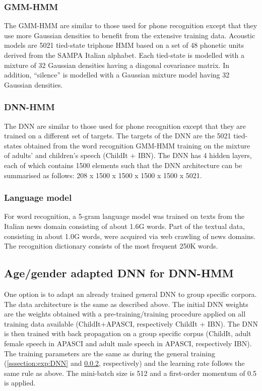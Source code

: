 \documentclass{nle}
\begin{document}
\subsubsection{GMM-HMM}\label{sssection:baseW}

The GMM-HMM are similar to those used for phone recognition except that they use more Gaussian densities to benefit from the extensive training data. Acoustic models  are 5021 tied-state  triphone HMM
based on  a set of  48 phonetic units  derived from the  SAMPA Italian
alphabet. Each tied-state is modelled with  a mixture of  32 Gaussian
densities   having  a  diagonal   covariance  matrix. In  addition,
``silence''  is  modelled  with  a  Gaussian mixture  model  having  32
Gaussian densities.


\subsubsection{DNN-HMM}\label{sssection:exp:DNNW}
The DNN  are similar to those  used for phone  recognition except that
they are  trained on a different  set of targets. The  targets of the
DNN are the 5021 tied-states obtained from the word recognition GMM-HMM training on the
mixture of adults' and children's  speech (ChildIt + IBN). The DNN has
4 hidden  layers, each of which  contains 1500 elements  such that the
DNN architecture  can be summarised  as follows: 208  x 1500 x  1500 x
1500 x 1500 x 5021.

\subsubsection{Language model}
For word  recognition, a  5-gram language model  was trained  on texts
from the Italian  news domain consisting of about  1.6G words. Part of
the textual  data, consisting in  about 1.0G words, were  acquired via
web crawling of news  domains.  The recognition dictionary consists of
the most frequent 250K words.

\subsection{Age/gender adapted DNN for DNN-HMM}
One option is to adapt an already trained general DNN  to group specific corpora. The data architecture is the same as described above. The initial DNN weights are the weights obtained with a pre-training/training procedure applied on all training data available  (ChildIt+APASCI, respectively ChildIt + IBN). The DNN is then trained with back propagation on a group specific corpus (ChildIt, adult female speech in APASCI and adult male speech in APASCI, respectively IBN). The training parameters are the same as during the general training (\ref{sssection:exp:DNN} and \ref{sssection:exp:DNNW}, respectively) and the learning rate follows the same rule as above. The mini-batch size is 512 and a first-order momentum of 0.5 is applied.
\end{document}
